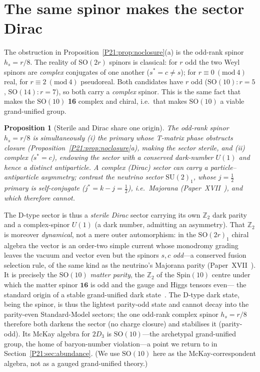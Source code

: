 \documentclass[11pt,a4paper]{article}
\newtheorem{proposition}[theorem]{Proposition}
\theoremstyle{definition}\newtheorem{definition}[theorem]{Definition}
\theoremstyle{remark}
\newcommand{\SU}{\mathrm{SU}}
\newcommand{\SO}{\mathrm{SO}}
\newcommand{\twoD}{2D}
\newcommand{\Ztwo}{\mathbb{Z}_2}
\begin{document}
\section{The same spinor makes the sector Dirac}
\label{P21:sec:dirac}
The obstruction in Proposition~\ref{P21:prop:noclosure}(a) is the odd-rank
spinor $h_s=r/8$. The reality of SO$(2r)$ spinors is classical: for $r$
odd the two Weyl spinors are \emph{complex} conjugates of one another
($s^{*}=c\neq s$); for $r\equiv0\ (\mathrm{mod}\ 4)$ real, for
$r\equiv2\ (\mathrm{mod}\ 4)$ pseudoreal. Both candidates have $r$ odd
($\SO(10):r=5$, $\SO(14):r=7$), so both carry a \emph{complex} spinor.
This is the same fact that makes the $\SO(10)$ \textbf{16} complex and
chiral, i.e.\ that makes $\SO(10)$ a viable grand-unified group.

\begin{proposition}[Sterile and Dirac share one origin]
\label{P21:prop:sterile_dirac}
The odd-rank spinor $h_s=r/8$ is simultaneously (i) the primary whose
T-matrix phase obstructs closure (Proposition~\ref{P21:prop:noclosure}a),
making the sector sterile, and (ii) complex ($s^{*}=c$), endowing the
sector with a conserved dark-number $U(1)$ and hence a distinct
antiparticle. A complex (Dirac) sector can carry a particle--antiparticle
asymmetry; contrast the neutrino sector $\SU(2)_1$, whose $j=\tfrac12$
primary is self-conjugate ($j^{*}=k-j=\tfrac12$), i.e.\ Majorana
(Paper~XVII~\cite{Paper17}), and which therefore cannot.
\end{proposition}

\noindent The D-type sector is thus a \emph{sterile Dirac} sector carrying
its own $\Ztwo$ dark parity and a complex-spinor $U(1)$ (a dark number,
admitting an asymmetry). That $\Ztwo$ is moreover \emph{dynamical}, not a
mere outer automorphism: in the $\SO(2r)_1$ chiral algebra the vector is an
order-two simple current whose monodromy grading leaves the vacuum and
vector even but the spinors $s,c$ \emph{odd}---a conserved fusion selection
rule, of the same kind as the neutrino's Majorana parity
(Paper~XVII~\cite{Paper17}). It is precisely the $\SO(10)$ \emph{matter
parity}, the $\Ztwo$ of the $\mathrm{Spin}(10)$ centre under which the
matter spinor $\mathbf{16}$ is odd and the gauge and Higgs tensors even---
the standard origin of a stable grand-unified dark state~\cite{Martin1992}.
The D-type dark state, being the spinor, is thus the lightest parity-odd
state and cannot decay into the parity-even Standard-Model sectors; the one
odd-rank complex spinor $h_s=r/8$ therefore both darkens the sector (no
charge closure) and stabilises it (parity-odd). Its McKay
algebra for $\twoD_3$ is $\SO(10)$---the archetypal grand-unified group,
the home of baryon-number violation---a point we return to in
Section~\ref{P21:sec:abundance}. (We use $\SO(10)$ here as the
McKay-correspondent algebra, not as a gauged grand-unified theory.)
\end{document}

